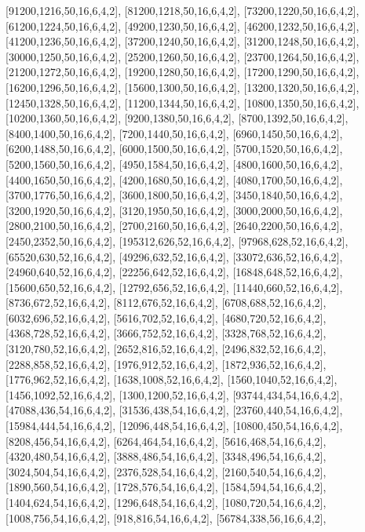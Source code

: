 \documentclass[12pt]{amsart}
\begin{document}
[91200,1216,50,16,6,4,2],   [81200,1218,50,16,6,4,2],   [73200,1220,50,16,6,4,2],   [61200,1224,50,16,6,4,2],   [49200,1230,50,16,6,4,2],   [46200,1232,50,16,6,4,2],
[41200,1236,50,16,6,4,2],   [37200,1240,50,16,6,4,2],   [31200,1248,50,16,6,4,2],   [30000,1250,50,16,6,4,2],   [25200,1260,50,16,6,4,2],   [23700,1264,50,16,6,4,2],
[21200,1272,50,16,6,4,2],   [19200,1280,50,16,6,4,2],   [17200,1290,50,16,6,4,2],   [16200,1296,50,16,6,4,2],   [15600,1300,50,16,6,4,2],   [13200,1320,50,16,6,4,2],
[12450,1328,50,16,6,4,2],   [11200,1344,50,16,6,4,2],   [10800,1350,50,16,6,4,2],   [10200,1360,50,16,6,4,2],   [9200,1380,50,16,6,4,2],   [8700,1392,50,16,6,4,2],
[8400,1400,50,16,6,4,2],   [7200,1440,50,16,6,4,2],   [6960,1450,50,16,6,4,2],   [6200,1488,50,16,6,4,2],   [6000,1500,50,16,6,4,2],   [5700,1520,50,16,6,4,2],
[5200,1560,50,16,6,4,2],   [4950,1584,50,16,6,4,2],   [4800,1600,50,16,6,4,2],   [4400,1650,50,16,6,4,2],   [4200,1680,50,16,6,4,2],   [4080,1700,50,16,6,4,2],
[3700,1776,50,16,6,4,2],   [3600,1800,50,16,6,4,2],   [3450,1840,50,16,6,4,2],   [3200,1920,50,16,6,4,2],   [3120,1950,50,16,6,4,2],   [3000,2000,50,16,6,4,2],
[2800,2100,50,16,6,4,2],   [2700,2160,50,16,6,4,2],   [2640,2200,50,16,6,4,2],   [2450,2352,50,16,6,4,2],   [195312,626,52,16,6,4,2],   [97968,628,52,16,6,4,2],
[65520,630,52,16,6,4,2],   [49296,632,52,16,6,4,2],   [33072,636,52,16,6,4,2],   [24960,640,52,16,6,4,2],   [22256,642,52,16,6,4,2],   [16848,648,52,16,6,4,2],
[15600,650,52,16,6,4,2],   [12792,656,52,16,6,4,2],   [11440,660,52,16,6,4,2],   [8736,672,52,16,6,4,2],   [8112,676,52,16,6,4,2],   [6708,688,52,16,6,4,2],
[6032,696,52,16,6,4,2],   [5616,702,52,16,6,4,2],   [4680,720,52,16,6,4,2],   [4368,728,52,16,6,4,2],   [3666,752,52,16,6,4,2],   [3328,768,52,16,6,4,2],
[3120,780,52,16,6,4,2],   [2652,816,52,16,6,4,2],   [2496,832,52,16,6,4,2],   [2288,858,52,16,6,4,2],   [1976,912,52,16,6,4,2],   [1872,936,52,16,6,4,2],
[1776,962,52,16,6,4,2],   [1638,1008,52,16,6,4,2],   [1560,1040,52,16,6,4,2],   [1456,1092,52,16,6,4,2],   [1300,1200,52,16,6,4,2],   [93744,434,54,16,6,4,2],
[47088,436,54,16,6,4,2],   [31536,438,54,16,6,4,2],   [23760,440,54,16,6,4,2],   [15984,444,54,16,6,4,2],   [12096,448,54,16,6,4,2],   [10800,450,54,16,6,4,2],
[8208,456,54,16,6,4,2],   [6264,464,54,16,6,4,2],   [5616,468,54,16,6,4,2],   [4320,480,54,16,6,4,2],   [3888,486,54,16,6,4,2],   [3348,496,54,16,6,4,2],
[3024,504,54,16,6,4,2],   [2376,528,54,16,6,4,2],   [2160,540,54,16,6,4,2],   [1890,560,54,16,6,4,2],   [1728,576,54,16,6,4,2],   [1584,594,54,16,6,4,2],
[1404,624,54,16,6,4,2],   [1296,648,54,16,6,4,2],   [1080,720,54,16,6,4,2],   [1008,756,54,16,6,4,2],   [918,816,54,16,6,4,2],   [56784,338,56,16,6,4,2],
\end{document}

